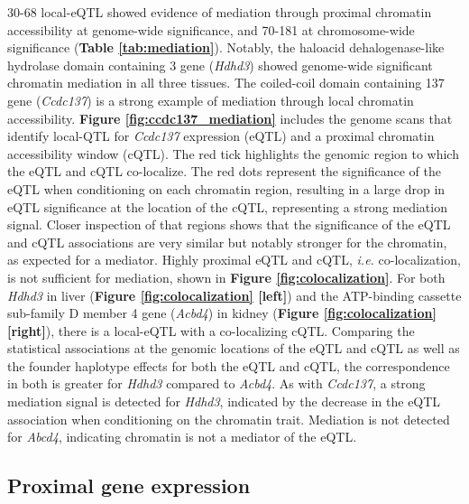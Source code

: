 30-68 local-eQTL showed evidence of mediation through proximal chromatin accessibility at genome-wide significance, and 70-181 at chromosome-wide significance (\textbf{Table \ref{tab:mediation}}). Notably, the haloacid dehalogenase-like hydrolase domain containing 3 gene (\textit{Hdhd3}) showed genome-wide significant chromatin mediation in all three tissues. The coiled-coil domain containing 137 gene (\textit{Ccdc137}) is a strong example of mediation through local chromatin accessibility. \textbf{Figure \ref{fig:ccdc137_mediation}} includes the genome scans that identify local-QTL for \textit{Ccdc137} expression (eQTL) and a proximal chromatin accessibility window (cQTL). The red tick highlights the genomic region to which the eQTL and cQTL co-localize. The red dots represent the significance of the eQTL when conditioning on each chromatin region, resulting in a large drop in eQTL significance at the location of the cQTL, representing a strong mediation signal. Closer inspection of that regions shows that the significance of the eQTL and cQTL associations are very similar but notably stronger for the chromatin, as expected for a mediator. Highly proximal eQTL and cQTL, \textit{i.e.} co-localization, is not sufficient for mediation, shown in \textbf{Figure \ref{fig:colocalization}}. For both \textit{Hdhd3} in liver (\textbf{Figure \ref{fig:colocalization} [left]}) and the ATP-binding cassette sub-family D member 4 gene (\textit{Acbd4}) in kidney (\textbf{Figure \ref{fig:colocalization} [right]}), there is a local-eQTL with a co-localizing cQTL. Comparing the statistical associations at the genomic locations of the eQTL and cQTL as well as the founder haplotype effects for both the eQTL and cQTL, the correspondence in both is greater for \textit{Hdhd3} compared to \textit{Acbd4}. As with \textit{Ccdc137}, a strong mediation signal is detected for \textit{Hdhd3}, indicated by the decrease in the eQTL association when conditioning on the chromatin trait. Mediation is not detected for \textit{Abcd4}, indicating chromatin is not a mediator of the eQTL.

\subsection{Proximal gene expression}

